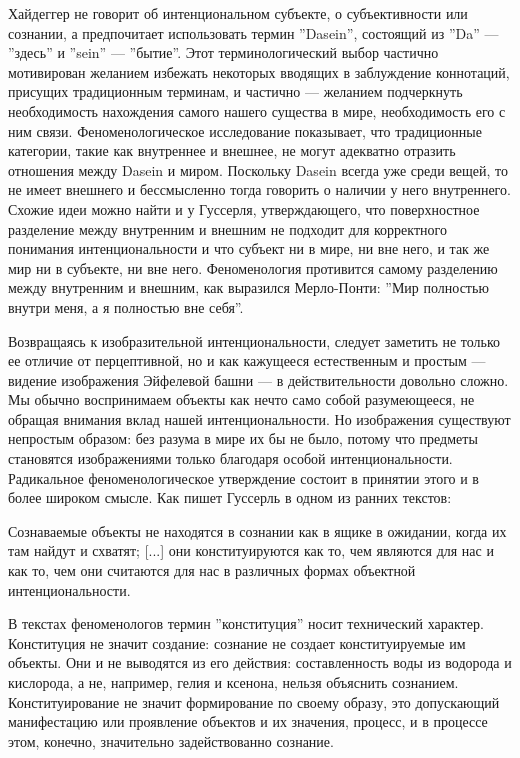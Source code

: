 \documentclass[11pt]{book}
\begin{document}
\relax
{}\relax
\smallskip

Хайдеггер не говорит об интенциональном субъекте, о субъективности или сознании, а предпочитает использовать термин ''Dasein'', состоящий из ''Da'' --- ''здесь'' и ''sein'' --- ''бытие''. Этот терминологический выбор частично мотивирован желанием избежать некоторых вводящих в заблуждение коннотаций, присущих традиционным терминам, и частично --- желанием подчеркнуть необходимость нахождения самого нашего существа в мире, необходимость его с ним связи. Феноменологическое исследование показывает, что традиционные категории, такие как внутреннее и внешнее, не могут адекватно отразить отношения между Dasein и миром. Поскольку Dasein всегда уже среди вещей, то не имеет внешнего и бессмысленно тогда говорить о наличии у него внутреннего. Схожие идеи можно найти и у Гуссерля, утверждающего, что поверхностное разделение между внутренним и внешним не подходит для корректного понимания интенциональности и что субъект ни в мире, ни вне него, и так же мир ни в субъекте, ни вне него. Феноменология противится самому разделению между внутренним и внешним, как выразился Мерло-Понти: ''Мир полностью внутри меня, а я полностью вне себя''.

Возвращаясь к изобразительной интенциональности, следует заметить не только ее отличие от перцептивной, но и как кажущееся естественным и простым --- видение изображения Эйфелевой башни --- в действительности довольно сложно. Мы обычно воспринимаем объекты как нечто само собой разумеющееся, не обращая внимания вклад нашей интенциональности. Но изображения существуют непростым образом: без разума в мире их бы не было, потому что предметы становятся изображениями только благодаря особой интенциональности. Радикальное феноменологическое утверждение состоит в принятии этого и в более широком смысле. Как пишет Гуссерль в одном из ранних текстов:

\smallskip
{}\relax
{}\relax

Сознаваемые объекты не находятся в сознании как в ящике в ожидании, когда их там найдут и схватят; [...] они конституируются как то, чем являются для нас и как то, чем они считаются для нас в различных формах объектной интенциональности.

\relax
{}\relax
\smallskip

В текстах феноменологов термин ''конституция'' носит технический характер. Конституция не значит создание: сознание не создает конституируемые им объекты. Они и не выводятся из его действия: составленность воды из водорода и кислорода, а не, например, гелия и ксенона, нельзя объяснить сознанием. Конституирование не значит формирование по своему образу, это допускающий манифестацию или проявление объектов и их значения, процесс, и в процессе этом, конечно, значительно задействованно сознание.
\end{document}
